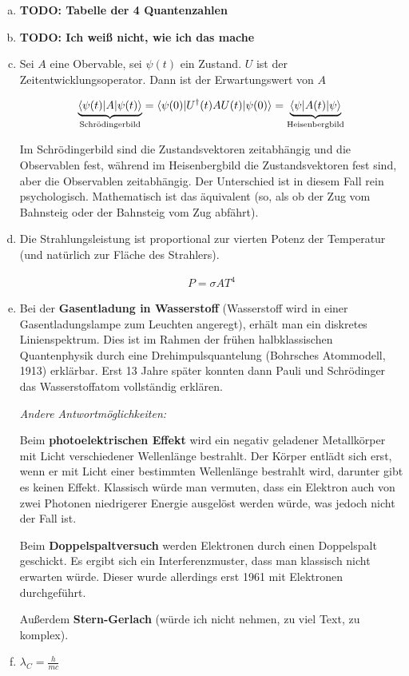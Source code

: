 \documentclass[a4paper,german,12pt,smallheadings]{scrartcl}
\begin{document}
\begin{enumerate}[a)]
  \item
    \textbf{TODO: Tabelle der 4 Quantenzahlen}

  \item
    \textbf{TODO: Ich weiß nicht, wie ich das mache}

  \item
    Sei $A$ eine Obervable, sei $\psi(t)$ ein Zustand. $U$ ist der
    Zeitentwicklungsoperator. Dann ist der Erwartungswert von $A$

    \begin{align*}
      \underbrace{\braket{\psi(t)|A|\psi(t)}}_{\text{Schrödingerbild}}
      = \braket{\psi(0)|U^\dagger(t)AU(t)|\psi(0)}
      = \underbrace{\braket{\psi|A(t)|\psi}}_{\text{Heisenbergbild}}
    \end{align*}

    Im Schrödingerbild sind die Zustandsvektoren zeitabhängig und die
    Observablen fest, während im Heisenbergbild die Zustandsvektoren fest sind,
    aber die Observablen zeitabhängig. Der Unterschied ist in diesem Fall rein
    psychologisch. Mathematisch ist das äquivalent (so, als ob der Zug vom
    Bahnsteig oder der Bahnsteig vom Zug abfährt).

  \item
    Die Strahlungsleistung ist proportional zur vierten Potenz der Temperatur
    (und natürlich zur Fläche des Strahlers).

    \begin{align*}
      P = \sigma A T^4
    \end{align*}

  \item
    Bei der \textbf{Gasentladung in Wasserstoff} (Wasserstoff wird in einer
    Gasentladungslampe zum Leuchten angeregt), erhält man ein diskretes
    Linienspektrum. Dies ist im Rahmen der frühen halbklassischen Quantenphysik
    durch eine Drehimpulsquantelung (Bohrsches Atommodell, 1913) erklärbar.
    Erst 13 Jahre später konnten dann Pauli und Schrödinger das Wasserstoffatom
    vollständig erklären.

    \textit{Andere Antwortmöglichkeiten:}

    Beim \textbf{photoelektrischen Effekt} wird ein negativ geladener
    Metallkörper mit Licht verschiedener Wellenlänge bestrahlt. Der Körper
    entlädt sich erst, wenn er mit Licht einer bestimmten Wellenlänge bestrahlt
    wird, darunter gibt es keinen Effekt. Klassisch würde man vermuten, dass
    ein Elektron auch von zwei Photonen niedrigerer Energie ausgelöst werden
    würde, was jedoch nicht der Fall ist.

    Beim \textbf{Doppelspaltversuch} werden Elektronen durch einen Doppelspalt
    geschickt. Es ergibt sich ein Interferenzmuster, dass man klassisch nicht
    erwarten würde. Dieser wurde allerdings erst 1961 mit Elektronen
    durchgeführt.

    Außerdem \textbf{Stern-Gerlach} (würde ich nicht nehmen, zu viel Text, zu
    komplex).

  \item
    $\lambda_C = \frac{h}{mc}$
\end{enumerate}
\end{document}

